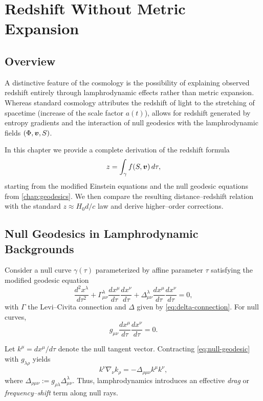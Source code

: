 
\chapter{Redshift Without Metric Expansion}
\label{chap:redshift}

\section{Overview}

A distinctive feature of the \rsvpabbr{} cosmology is the possibility of
explaining observed redshift entirely through lamphrodynamic effects rather
than metric expansion. Whereas standard cosmology attributes the redshift of
light to the stretching of spacetime (increase of the scale factor $a(t)$),
\rsvpabbr{} allows for redshift generated by entropy gradients and the
interaction of null geodesics with the lamphrodynamic fields
$(\Phi,\bm{v},S)$.

In this chapter we provide a complete derivation of the redshift formula
\[
  z = \int_\gamma f(S,\bm{v})\,d\tau,
\]
starting from the modified Einstein equations and the null geodesic
equations from \cref{chap:geodesics}. We then compare the resulting
distance--redshift relation with the standard $z \approx H_0 d/c$ law and
derive higher--order corrections.

\section{Null Geodesics in Lamphrodynamic Backgrounds}

Consider a null curve $\gamma(\tau)$ parameterized by affine parameter $\tau$
satisfying the modified geodesic equation
\begin{equation}
\label{eq:null-geodesic}
  \frac{d^2 x^\lambda}{d\tau^2}
  + \Gamma^\lambda_{\mu\nu}
  \frac{dx^\mu}{d\tau}\frac{dx^\nu}{d\tau}
  + \Delta^\lambda_{\mu\nu}
  \frac{dx^\mu}{d\tau}\frac{dx^\nu}{d\tau}
  = 0,
\end{equation}
with $\Gamma$ the Levi--Civita connection and $\Delta$ given by
\eqref{eq:delta-connection}. For null curves,
\[
  g_{\mu\nu}\frac{dx^\mu}{d\tau}\frac{dx^\nu}{d\tau}=0.
\]

Let $k^\mu = dx^\mu/d\tau$ denote the null tangent vector. Contracting
\eqref{eq:null-geodesic} with $g_{\lambda\rho}$ yields
\[
  k^\nu \nabla_\nu k_\rho
  = -\Delta_{\rho\mu\nu} k^\mu k^\nu,
\]
where $\Delta_{\rho\mu\nu} := g_{\rho\lambda}\Delta^\lambda_{\mu\nu}$.
Thus, lamphrodynamics introduces an effective \emph{drag} or
\emph{frequency--shift} term along null rays.

